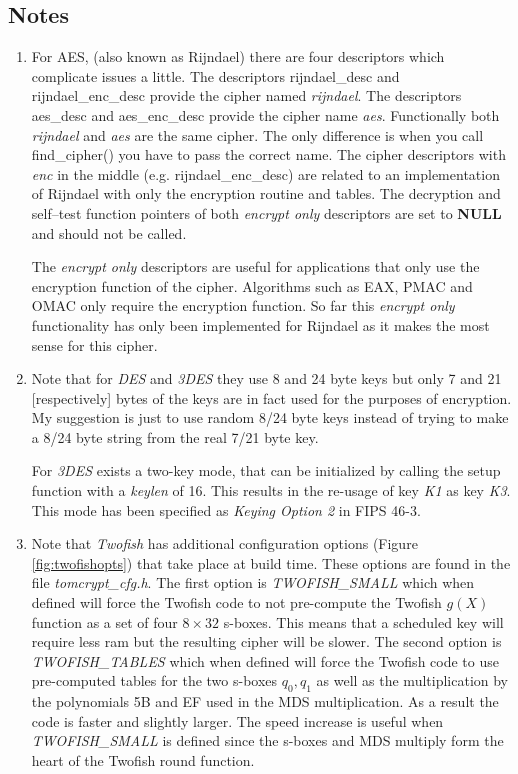 \documentclass[synpaper]{book}
\begin{document}
\subsection{Notes}
\begin{small}
\begin{enumerate}
\item
For AES, (also known as Rijndael) there are four descriptors which complicate issues a little.  The descriptors
rijndael\_desc and rijndael\_enc\_desc provide the cipher named \textit{rijndael}.  The descriptors aes\_desc and
aes\_enc\_desc provide the cipher name \textit{aes}.  Functionally both \textit{rijndael} and \textit{aes} are the same cipher.  The
only difference is when you call find\_cipher() you have to pass the correct name.  The cipher descriptors with \textit{enc}
in the middle (e.g. rijndael\_enc\_desc) are related to an implementation of Rijndael with only the encryption routine
and tables.  The decryption and self--test function pointers of both \textit{encrypt only} descriptors are set to \textbf{NULL} and
should not be called.

The \textit{encrypt only} descriptors are useful for applications that only use the encryption function of the cipher.  Algorithms such
as EAX, PMAC and OMAC only require the encryption function.  So far this \textit{encrypt only} functionality has only been implemented for
Rijndael as it makes the most sense for this cipher.

\item
Note that for \textit{DES} and \textit{3DES} they use 8 and 24 byte keys but only 7 and 21 [respectively] bytes of the keys are in
fact used for the purposes of encryption.  My suggestion is just to use random 8/24 byte keys instead of trying to make a 8/24
byte string from the real 7/21 byte key.

For \textit{3DES} exists a two-key mode, that can be initialized by calling the setup function with a \textit{keylen} of 16. This results in the re-usage of key \textit{K1} as key \textit{K3}. This mode has been specified as \textit{Keying Option 2} in FIPS 46-3.

\item
Note that \textit{Twofish} has additional configuration options (Figure \ref{fig:twofishopts}) that take place at build time.  These options are found in
the file \textit{tomcrypt\_cfg.h}.  The first option is \textit{TWOFISH\_SMALL} which when defined will force the Twofish code
to not pre-compute the Twofish \textit{$g(X)$} function as a set of four $8 \times 32$ s-boxes.  This means that a scheduled
key will require less ram but the resulting cipher will be slower.  The second option is \textit{TWOFISH\_TABLES} which when
defined will force the Twofish code to use pre-computed tables for the two s-boxes $q_0, q_1$ as well as the multiplication
by the polynomials 5B and EF used in the MDS multiplication.  As a result the code is faster and slightly larger.  The
speed increase is useful when \textit{TWOFISH\_SMALL} is defined since the s-boxes and MDS multiply form the heart of the
Twofish round function.


\end{enumerate}
\end{small}
\end{document}

